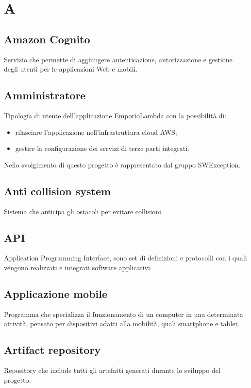\section{A}
\subsection*{Amazon Cognito}
Servizio che permette di aggiungere autenticazione, autorizzazione e gestione degli utenti per le applicazioni Web e mobili.

\subsection*{Amministratore}
Tipologia di utente dell'applicazione EmporioLambda con la possibilità di:
\begin{itemize}
    \item rilasciare l'applicazione nell'infrastruttura cloud AWS;
    \item gestire la configurazione dei servizi di terze parti integrati.
\end{itemize}
Nello svolgimento di questo progetto è rappresentato dal gruppo SWException.

\subsection*{Anti collision system}
Sistema che anticipa gli ostacoli per evitare collisioni.

\subsection*{API}
Application Programming Interface, sono set di definizioni e protocolli con i quali vengono realizzati e integrati software
applicativi.

\subsection*{Applicazione mobile}
Programma che specializza il funzionamento di un computer in una determinata attività, pensato per dispositivi adatti alla mobilità, quali smartphone e tablet.

\subsection*{Artifact repository}
Repository che include tutti gli artefatti generati durante lo sviluppo del progetto.

